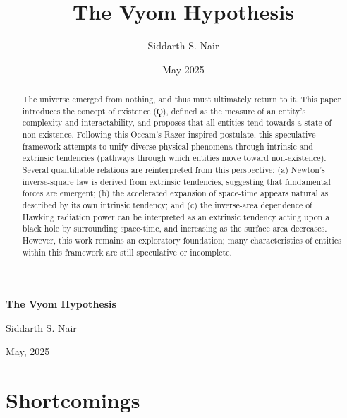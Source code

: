 \documentclass{article}
\title{The Vyom Hypothesis}
\author{Siddarth S. Nair}
\date{May 2025}
\begin{document}
\begin{titlepage}
    \centering
    \vspace*{\fill}
    {\Huge\bfseries The Vyom Hypothesis \par}
    \vspace{1cm}
    {\Large Siddarth S. Nair \par}
    \vspace{0.5cm}
    {\large May, 2025 \par}
    \vspace*{\fill}
    \thispagestyle{empty}
\end{titlepage}



\newpage
\sectionfont{\fontsize{23}{22}\bfseries}
\subsectionfont{\fontsize{15}{22}\bfseries}



\begin{abstract}

The universe emerged from nothing, and thus must ultimately return to it.
This paper introduces the concept of existence ($\Koppa$), defined as the measure of an entity’s complexity and interactability, and proposes that all entities tend towards a state of non-existence.
Following this Occam's Razer inspired postulate, this speculative framework attempts to unify diverse physical phenomena through intrinsic and extrinsic tendencies (pathways through which entities move toward non-existence).
Several quantifiable relations are reinterpreted from this perspective:
(a) Newton’s inverse-square law is derived from extrinsic tendencies, suggesting that fundamental forces are emergent;
(b) the accelerated expansion of space-time appears natural as described by its own intrinsic tendency; and
(c) the inverse-area dependence of Hawking radiation power can be interpreted as an extrinsic tendency acting upon a black hole by surrounding space-time, and increasing as the surface area decreases. 
However, this work remains an exploratory foundation; many characteristics of entities within this framework are still speculative or incomplete.

\end{abstract}



\newpage
\tableofcontents



\newpage
\section{Shortcomings}
\end{document}
